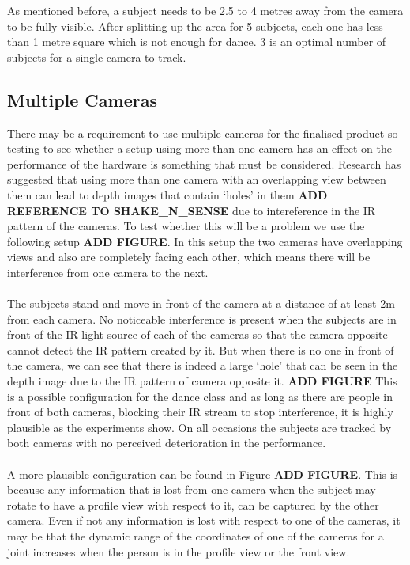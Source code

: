 \documentclass[10pt]{article}
\begin{document}
As mentioned before, a subject needs to be 2.5 to 4 metres away from the camera to be fully visible. After splitting up the area for 5 subjects, each one has less than 1 metre square which is not enough for dance. 3 is an optimal number of subjects for a single camera to track.\\


\subsection{Multiple Cameras}
\noindent
There may be a requirement to use multiple cameras for the finalised product so testing to see whether a setup using more than one camera has an effect on the performance of the hardware is something that must be considered. Research has suggested that using more than one camera with an overlapping view between them can lead to depth images that contain `holes' in them
\textbf{ADD REFERENCE TO SHAKE\_N\_SENSE} due to intereference in the IR pattern of the cameras. To test whether this will be a problem we use the following setup 
\textbf{ADD FIGURE}. In this setup the two cameras have overlapping views and also are completely facing each other, which means there will be interference from one camera to the next. 
\\\\
\noindent
The subjects stand and move in front of the camera at a distance of at least 2m from each camera. No noticeable interference is present when the subjects are in front of the IR light source of each of the cameras so that the camera opposite cannot detect the IR pattern created by it. But when there is no one in front of the camera, we can see that there is indeed a large `hole' that can be seen in the depth image due to the IR pattern of camera opposite it. 
\textbf{ADD FIGURE}
This is a possible configuration for the dance class and as long as there are people in front of both cameras, blocking their IR stream to stop interference, it is highly plausible as the experiments show. On all occasions the subjects are tracked by both cameras with no perceived deterioration in the performance. 
\\\\
\noindent
A more plausible configuration can be found in Figure \textbf{ADD FIGURE}. This is because any information that is lost from one camera when the subject may rotate to have a profile view with respect to it, can be captured by the other camera. Even if not any information is lost with respect to one of the cameras, it may be that the dynamic range of the coordinates of one of the cameras for a joint increases when the person is in the profile view or the front view. 
\end{document}
